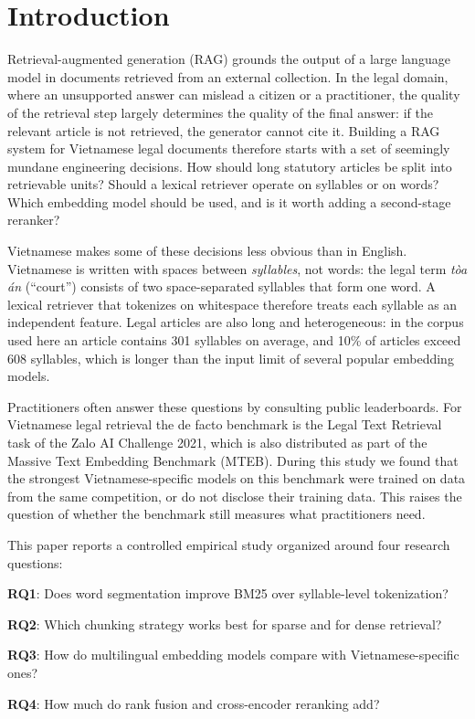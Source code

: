 \documentclass{ws-vjcs}
\begin{document}
\section{Introduction}

Retrieval-augmented generation (RAG) grounds the output of a large language model in documents retrieved from an external collection.\cite{lewis2020rag} In the legal domain, where an unsupported answer can mislead a citizen or a practitioner, the quality of the retrieval step largely determines the quality of the final answer: if the relevant article is not retrieved, the generator cannot cite it. Building a RAG system for Vietnamese legal documents therefore starts with a set of seemingly mundane engineering decisions. How should long statutory articles be split into retrievable units? Should a lexical retriever operate on syllables or on words? Which embedding model should be used, and is it worth adding a second-stage reranker?

Vietnamese makes some of these decisions less obvious than in English. Vietnamese is written with spaces between \emph{syllables}, not words: the legal term \emph{t\`oa \'an} (``court'') consists of two space-separated syllables that form one word. A lexical retriever that tokenizes on whitespace therefore treats each syllable as an independent feature. Legal articles are also long and heterogeneous: in the corpus used here an article contains 301 syllables on average, and 10\% of articles exceed 608 syllables, which is longer than the input limit of several popular embedding models.

Practitioners often answer these questions by consulting public leaderboards. For Vietnamese legal retrieval the de facto benchmark is the Legal Text Retrieval task of the Zalo AI Challenge 2021,\cite{zalo2021legal} which is also distributed as part of the Massive Text Embedding Benchmark (MTEB).\cite{muennighoff2023mteb} During this study we found that the strongest Vietnamese-specific models on this benchmark were trained on data from the same competition, or do not disclose their training data. This raises the question of whether the benchmark still measures what practitioners need.

This paper reports a controlled empirical study organized around four research questions:
\begin{itemlist}
\item \textbf{RQ1}: Does word segmentation improve BM25 over syllable-level tokenization?
\item \textbf{RQ2}: Which chunking strategy works best for sparse and for dense retrieval?
\item \textbf{RQ3}: How do multilingual embedding models compare with Vietnamese-specific ones?
\item \textbf{RQ4}: How much do rank fusion and cross-encoder reranking add?
\end{itemlist}
\end{document}
